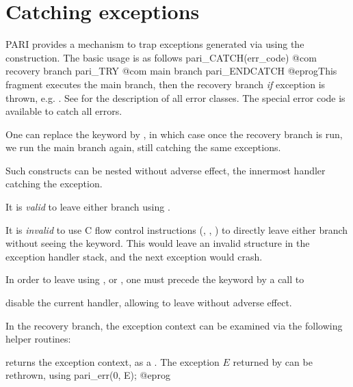 \section{Catching exceptions}


PARI provides a mechanism to trap exceptions generated via 
using the  construction. The basic usage is as follows
\bprog
 pari_CATCH(err_code) {
   @com recovery branch
 }
 pari_TRY {
   @com main branch
 }
 pari_ENDCATCH
@eprog\noindent This fragment executes the main branch, then the recovery
branch \emph{if} exception  is thrown, e.g. .
See  for the description of all error classes.
The special error code  is available to catch all errors.

One can replace the  keyword by , in which case
once the recovery branch is run, we run the main branch again, still catching
the same exceptions.


\item Such constructs can be nested without adverse effect, the innermost
handler catching the exception.

\item It is \emph{valid} to leave either branch using .

\item It is \emph{invalid} to use C flow control instructions (,
, ) to directly leave either branch without seeing
the  keyword. This would leave an invalid structure in the
exception handler stack, and the next exception would crash.

\item In order to leave using ,  or ,
one must precede the keyword by a call to

 disable the current handler, allowing to leave
without adverse effect.


In the recovery branch, the exception context can be examined via the
following helper routines:

 returns the exception context, as a .
The exception $E$ returned by  can be rethrown, using
\bprog
  pari_err(0, E);
@eprog

